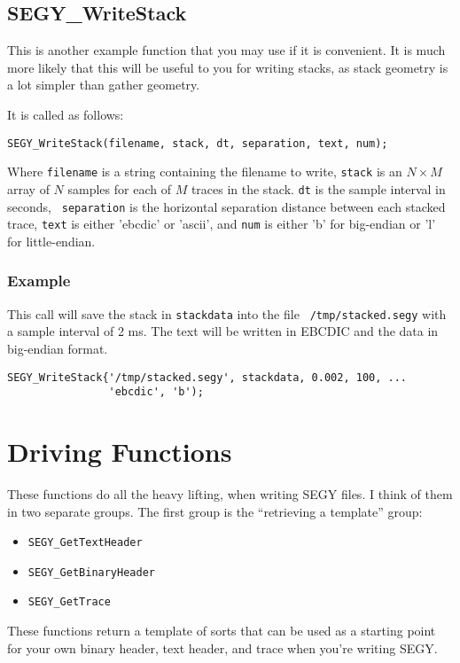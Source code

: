 \documentclass[10pt]{article}
\newcommand{\segy}{{\scriptsize SEGY}\xspace}
\newcommand{\ebcdic}{{\scriptsize EBCDIC}\xspace}
\begin{document}
\subsection{SEGY\_WriteStack}
This is another example function that you may use if it is
convenient. It is much more likely that this will be useful to you for
writing stacks, as stack geometry is a lot simpler than gather
geometry.

It is called as follows:
\begin{verbatim}
SEGY_WriteStack(filename, stack, dt, separation, text, num);
\end{verbatim}

Where {\tt filename} is a string containing the filename to write,
{\tt stack} is an $N \times M$ array of $N$ samples for each of $M$
traces in the stack. {\tt dt} is the sample interval in seconds, {\tt
  separation} is the horizontal separation distance between each
stacked trace, {\tt text} is either 'ebcdic' or 'ascii', and {\tt num}
is either 'b' for big-endian or 'l' for little-endian. 

\subsubsection{Example}

This call will save the stack in {\tt stackdata} into the file {\tt
  /tmp/stacked.segy} with a sample interval of 2 ms. The text will be
  written in \ebcdic and the data in big-endian format. 
\begin{verbatim}
SEGY_WriteStack{'/tmp/stacked.segy', stackdata, 0.002, 100, ...
                'ebcdic', 'b');
\end{verbatim}

\section{Driving Functions}
These functions do all the heavy lifting, when writing \segy files. I
think of them in two separate groups. The first group is the
``retrieving a template'' group:
\begin{itemize}
\item {\tt SEGY\_GetTextHeader}
\item {\tt SEGY\_GetBinaryHeader}
\item {\tt SEGY\_GetTrace}
\end{itemize}
These functions return a template of sorts that can be used as a
starting point for your own binary header, text header, and trace when
you're writing \segy.
\end{document}
